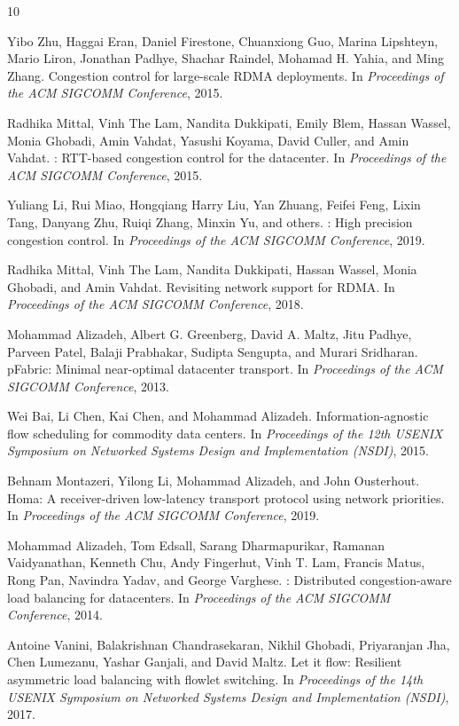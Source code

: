 \documentclass[conference]{IEEEtran}
\begin{document}

\begin{thebibliography}{10}

Yibo Zhu, Haggai Eran, Daniel Firestone, Chuanxiong Guo, Marina Lipshteyn,
  Mario Liron, Jonathan Padhye, Shachar Raindel, Mohamad H. Yahia, and Ming Zhang.
\newblock Congestion control for large-scale {RDMA} deployments.
\newblock In \emph{Proceedings of the ACM SIGCOMM Conference}, 2015.

Radhika Mittal, Vinh The Lam, Nandita Dukkipati, Emily Blem, Hassan Wassel,
  Monia Ghobadi, Amin Vahdat, Yasushi Koyama, David Culler, and Amin Vahdat.
: {RTT}-based congestion control for the datacenter.
\newblock In \emph{Proceedings of the ACM SIGCOMM Conference}, 2015.

Yuliang Li, Rui Miao, Hongqiang Harry Liu, Yan Zhuang, Feifei Feng,
  Lixin Tang, Danyang Zhu, Ruiqi Zhang, Minxin Yu, and others.
: High precision congestion control.
\newblock In \emph{Proceedings of the ACM SIGCOMM Conference}, 2019.

Radhika Mittal, Vinh The Lam, Nandita Dukkipati, Hassan Wassel, Monia Ghobadi,
  and Amin Vahdat.
\newblock Revisiting network support for {RDMA}.
\newblock In \emph{Proceedings of the ACM SIGCOMM Conference}, 2018.

Mohammad Alizadeh, Albert G. Greenberg, David A. Maltz, Jitu Padhye,
  Parveen Patel, Balaji Prabhakar, Sudipta Sengupta, and Murari Sridharan.
\newblock pFabric: Minimal near-optimal datacenter transport.
\newblock In \emph{Proceedings of the ACM SIGCOMM Conference}, 2013.

Wei Bai, Li Chen, Kai Chen, and Mohammad Alizadeh.
\newblock Information-agnostic flow scheduling for commodity data centers.
\newblock In \emph{Proceedings of the 12th USENIX Symposium on Networked Systems Design and Implementation (NSDI)}, 2015.

Behnam Montazeri, Yilong Li, Mohammad Alizadeh, and John Ousterhout.
\newblock Homa: A receiver-driven low-latency transport protocol using network priorities.
\newblock In \emph{Proceedings of the ACM SIGCOMM Conference}, 2019.

Mohammad Alizadeh, Tom Edsall, Sarang Dharmapurikar, Ramanan Vaidyanathan,
  Kenneth Chu, Andy Fingerhut, Vinh T. Lam, Francis Matus, Rong Pan,
  Navindra Yadav, and George Varghese.
: Distributed congestion-aware load balancing for datacenters.
\newblock In \emph{Proceedings of the ACM SIGCOMM Conference}, 2014.

Antoine Vanini, Balakrishnan Chandrasekaran, Nikhil Ghobadi, Priyaranjan Jha,
  Chen Lumezanu, Yashar Ganjali, and David Maltz.
\newblock Let it flow: Resilient asymmetric load balancing with flowlet switching.
\newblock In \emph{Proceedings of the 14th USENIX Symposium on Networked Systems Design and Implementation (NSDI)}, 2017.

\end{thebibliography}
\end{document}
